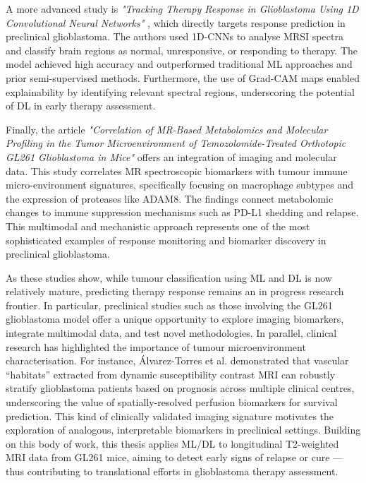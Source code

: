 \documentclass[12pt, a4paper]{report}
\begin{document}
A more advanced study is \textit{"Tracking Therapy Response in Glioblastoma Using 1D Convolutional Neural Networks"} \cite{Ortega-Martorell2023}, which directly targets response prediction in preclinical glioblastoma. The authors used 1D-CNNs to analyse MRSI spectra and classify brain regions as normal, unresponsive, or responding to therapy. The model achieved high accuracy and outperformed traditional ML approaches and prior semi-supervised methods. Furthermore, the use of Grad-CAM maps enabled explainability by identifying relevant spectral regions, underscoring the potential of DL in early therapy assessment.

Finally, the article \textit{"Correlation of MR-Based Metabolomics and Molecular Profiling in the Tumor Microenvironment of Temozolomide-Treated Orthotopic GL261 Glioblastoma in Mice"}  \cite{Zhao2023} offers an integration of imaging and molecular data. This study correlates MR spectroscopic biomarkers with tumour immune micro-environment signatures, specifically focusing on macrophage subtypes and the expression of proteases like ADAM8. The findings connect metabolomic changes to immune suppression mechanisms such as PD-L1 shedding and relapse. This multimodal and mechanistic approach represents one of the most sophisticated examples of response monitoring and biomarker discovery in preclinical glioblastoma.

As these studies show, while tumour classification using ML and DL is now relatively mature, predicting therapy response remains an in progress research frontier. In particular, preclinical studies such as those involving the GL261 glioblastoma model offer a unique opportunity to explore imaging biomarkers, integrate multimodal data, and test novel methodologies. In parallel, clinical research has highlighted the importance of tumour microenvironment characterisation. For instance, Álvarez-Torres et al. \cite{Alvarez-Torres2020} demonstrated that vascular “habitats” extracted from dynamic susceptibility contrast MRI can robustly stratify glioblastoma patients based on prognosis across multiple clinical centres, underscoring the value of spatially-resolved perfusion biomarkers for survival prediction. This kind of clinically validated imaging signature motivates the exploration of analogous, interpretable biomarkers in preclinical settings. Building on this body of work, this thesis applies ML/DL to longitudinal T2-weighted MRI data from GL261 mice, aiming to detect early signs of relapse or cure — thus contributing to translational efforts in glioblastoma therapy assessment.
\end{document}
